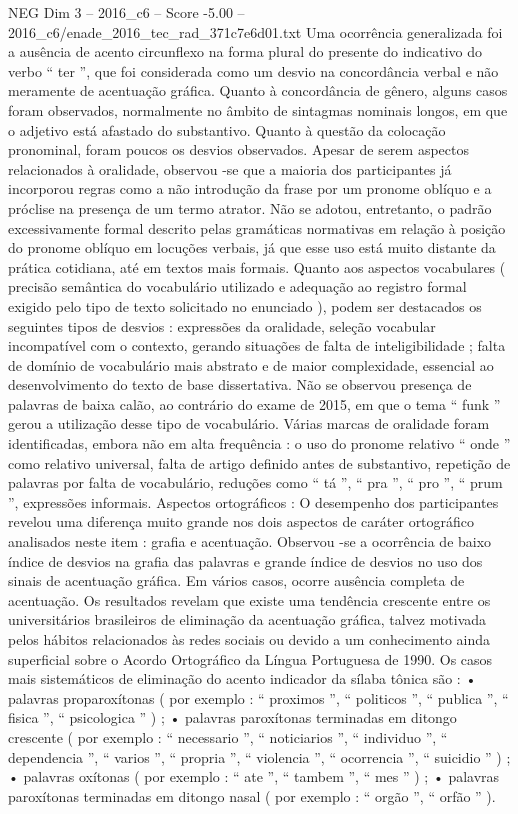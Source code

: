 \begin{textsample}{NEG Dim 3 – 2016\_c6 – Score -5.00 – 2016\_c6/enade\_2016\_tec\_rad\_371c7e6d01.txt}
Uma ocorrência generalizada foi a ausência de acento circunflexo na forma plural do presente do indicativo do verbo “ ter ”, que foi considerada como um desvio na concordância verbal e não meramente de acentuação gráfica.
Quanto à concordância de gênero, alguns casos foram observados, normalmente no âmbito de sintagmas nominais longos, em que o adjetivo está afastado do substantivo.
Quanto à questão da colocação pronominal, foram poucos os desvios observados.
Apesar de serem aspectos relacionados à oralidade, observou -se que a maioria dos participantes já incorporou regras como a não introdução da frase por um pronome oblíquo e a próclise na presença de um termo atrator.
Não se adotou, entretanto, o padrão excessivamente formal descrito pelas gramáticas normativas em relação à posição do pronome oblíquo em locuções verbais, já que esse uso está muito distante da prática cotidiana, até em textos mais formais.
Quanto aos aspectos vocabulares ( precisão semântica do vocabulário utilizado e adequação ao registro formal exigido pelo tipo de texto solicitado no enunciado ), podem ser destacados os seguintes tipos de desvios : expressões da oralidade, seleção vocabular incompatível com o contexto, gerando situações de falta de inteligibilidade ; falta de domínio de vocabulário mais abstrato e de maior complexidade, essencial ao desenvolvimento do texto de base dissertativa.
Não se observou presença de palavras de baixa calão, ao contrário do exame de 2015, em que o tema “ funk ” gerou a utilização desse tipo de vocabulário.
Várias marcas de oralidade foram identificadas, embora não em alta frequência : o uso do pronome relativo “ onde ” como relativo universal, falta de artigo definido antes de substantivo, repetição de palavras por falta de vocabulário, reduções como “ tá ”, “ pra ”, “ pro ”, “ prum ”, expressões informais.
Aspectos ortográficos : O desempenho dos participantes revelou uma diferença muito grande nos dois aspectos de caráter ortográfico analisados neste item : grafia e acentuação.
Observou -se a ocorrência de baixo índice de desvios na grafia das palavras e grande índice de desvios no uso dos sinais de acentuação gráfica.
Em vários casos, ocorre ausência completa de acentuação.
Os resultados revelam que existe uma tendência crescente entre os universitários brasileiros de eliminação da acentuação gráfica, talvez motivada pelos hábitos relacionados às redes sociais ou devido a um conhecimento ainda superficial sobre o Acordo Ortográfico da Língua Portuguesa de 1990.
Os casos mais sistemáticos de eliminação do acento indicador da sílaba tônica são : • palavras proparoxítonas ( por exemplo : “ proximos ”, “ politicos ”, “ publica ”, “ fisica ”, “ psicologica ” ) ; • palavras paroxítonas terminadas em ditongo crescente ( por exemplo : “ necessario ”, “ noticiarios ”, “ individuo ”, “ dependencia ”, “ varios ”, “ propria ”, “ violencia ”, “ ocorrencia ”, “ suicidio ” ) ; • palavras oxítonas ( por exemplo : “ ate ”, “ tambem ”, “ mes ” ) ; • palavras paroxítonas terminadas em ditongo nasal ( por exemplo : “ orgão ”, “ orfão ” ).

\end{textsample}
